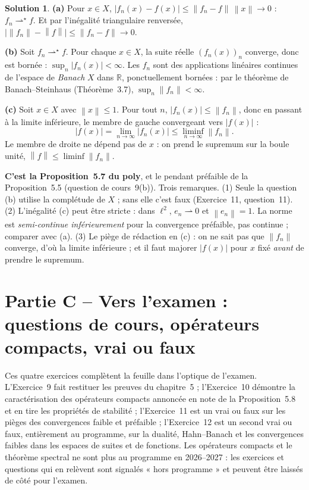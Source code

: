 \documentclass[11pt,a4paper]{article}
\newcommand{\R}{\mathbb{R}}
\newcommand{\norm}[1]{\left\|#1\right\|}
\newcommand{\wk}{\rightharpoonup}
\newcommand{\wks}{\rightharpoonup^{\!\star}}
\theoremstyle{definition}
\newtheorem*{solution}{Solution}
\begin{document}
\begin{solution}
\noindent\textbf{(a)} Pour $x\in X$, $|f_n(x)-f(x)|\le\norm{f_n-f}\,\norm x\to0$ : $f_n\wks f$. Et par l'inégalité triangulaire renversée, $\big|\norm{f_n}-\norm f\big|\le\norm{f_n-f}\to0$.

\medskip
\noindent\textbf{(b)} Soit $f_n\wks f$. Pour chaque $x\in X$, la suite réelle $(f_n(x))_n$ converge, donc est bornée : $\sup_n|f_n(x)|<\infty$. Les $f_n$ sont des applications linéaires continues de l'espace de \emph{Banach} $X$ dans $\R$, ponctuellement bornées : par le théorème de Banach--Steinhaus (Théorème~3.7), $\sup_n\norm{f_n}<\infty$.

\medskip
\noindent\textbf{(c)} Soit $x\in X$ avec $\norm x\le1$. Pour tout $n$, $|f_n(x)|\le\norm{f_n}$, donc en passant à la limite inférieure, le membre de gauche convergeant vers $|f(x)|$ :
\[
|f(x)|=\lim_{n\to\infty}|f_n(x)|\le\liminf_{n\to\infty}\norm{f_n} .
\]
Le membre de droite ne dépend pas de $x$ : on prend le supremum sur la boule unité, $\norm f\le\liminf\norm{f_n}$.
\end{solution}

\begin{pointcle}
\textbf{C'est la Proposition~5.7 du poly}, et le pendant préfaible de la Proposition~5.5 (question de cours~9(b)). Trois remarques. (1) Seule la question (b) utilise la complétude de $X$ ; sans elle c'est faux (Exercice~11, question~11). (2) L'inégalité (c) peut être stricte : dans $\ell^2$, $e_n\wk0$ et $\norm{e_n}=1$. La norme est \emph{semi-continue inférieurement} pour la convergence préfaible, pas continue ; comparer avec (a). (3) Le piège de rédaction en (c) : on ne sait pas que $\norm{f_n}$ converge, d'où la limite inférieure ; et il faut majorer $|f(x)|$ pour $x$ fixé \emph{avant} de prendre le supremum.
\end{pointcle}

\section*{Partie C -- Vers l'examen : questions de cours, opérateurs compacts, vrai ou faux}

\begin{commentaire}
Ces quatre exercices complètent la feuille dans l'optique de l'examen. L'Exercice~9 fait restituer les preuves du chapitre~5 ; l'Exercice~10 démontre la caractérisation des opérateurs compacts annoncée en note de la Proposition~5.8 et en tire les propriétés de stabilité ; l'Exercice~11 est un vrai ou faux sur les pièges des convergences faible et préfaible ; l'Exercice~12 est un second vrai ou faux, entièrement au programme, sur la dualité, Hahn--Banach et les convergences faibles dans les espaces de suites et de fonctions. Les opérateurs compacts et le théorème spectral ne sont plus au programme en 2026--2027 : les exercices et questions qui en relèvent sont signalés « hors programme » et peuvent être laissés de côté pour l'examen.
\end{commentaire}
\end{document}
